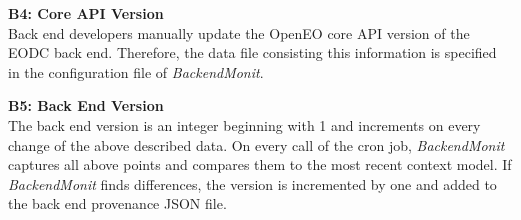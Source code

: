 \documentclass[draft,final]{vutinfth} %
\begin{document}



\textbf{B4: Core API Version} \\
Back end developers manually update the OpenEO core API version of the EODC back end. Therefore, the data file consisting this information is specified in the configuration file of \textit{BackendMonit}. 

\textbf{B5: Back End Version} \\
The back end version is an integer beginning with 1 and increments on every change of the above described data. On every call of the cron job, \textit{BackendMonit} captures all above points and compares them to the most recent context model. If \textit{BackendMonit} finds differences, the version is incremented by one and added to the back end provenance JSON file. 
\end{document}
